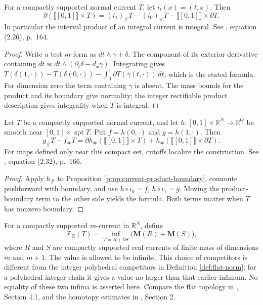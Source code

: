 \begin{proposition}\label{prop:current-product-boundary}
For a compactly supported normal current $T$, let $i_t(x)=(t,x)$. Then
\[
 \partial(\llbracket[0,1]\rrbracket\times T)
 =(i_1)_\#T-(i_0)_\#T-\llbracket[0,1]\rrbracket\times\partial T.
\]
In particular the interval product of an integral current is integral. See \cite{Sim18}, equation (2.26), p.~164.
\end{proposition}
\begin{proof}
Write a test $m$-form as $dt\wedge\gamma+\delta$. The component of its exterior derivative containing $dt$ is $dt\wedge(\partial_t\delta-d_x\gamma)$. Integrating gives
$T(\delta(1,\cdot))-T(\delta(0,\cdot))-\int_0^1\partial T(\gamma(t,\cdot))\,dt$,
which is the stated formula. For dimension zero the term containing $\gamma$ is absent. The mass bounds for the product and its boundary give normality; the integer rectifiable product description gives integrality when $T$ is integral.
\end{proof}

\begin{proposition}\label{prop:current-homotopy}
Let $T$ be a compactly supported normal current, and let $h:[0,1]\times\mathbb R^N\to\mathbb R^Q$ be smooth near $[0,1]\times\operatorname{spt}T$. Put $f=h(0,\cdot)$ and $g=h(1,\cdot)$. Then
\[
 g_\#T-f_\#T
 =\partial h_\#(\llbracket[0,1]\rrbracket\times T)
 +h_\#(\llbracket[0,1]\rrbracket\times\partial T).
\]
For maps defined only near this compact set, cutoffs localize the construction. See \cite{Sim18}, equation (2.32), p.~166.
\end{proposition}
\begin{proof}
Apply $h_\#$ to Proposition \ref{prop:current-product-boundary}, commute pushforward with boundary, and use $h\circ i_0=f$, $h\circ i_1=g$. Moving the product-boundary term to the other side yields the formula. Both terms matter when $T$ has nonzero boundary.
\end{proof}

\begin{definition}\label{def:real-current-flat-norm}
For a compactly supported $m$-current in $\mathbb R^N$, define
\[
 \mathcal F_{\mathbb R}(T)=\inf_{T=R+\partial S}
 \bigl(\mathbf M(R)+\mathbf M(S)\bigr),
\]
where $R$ and $S$ are compactly supported real currents of finite mass of dimensions $m$ and $m+1$. The value is allowed to be infinite. This choice of competitors is different from the integer polyhedral competitors in Definition \ref{def:flat-norm}; for a polyhedral integer chain it gives a value no larger than that earlier infimum. No equality of these two infima is asserted here. Compare the flat topology in \cite{Fed69}, Section 4.1, and the homotopy estimates in \cite{Sim18}, Section 2.
\end{definition}

